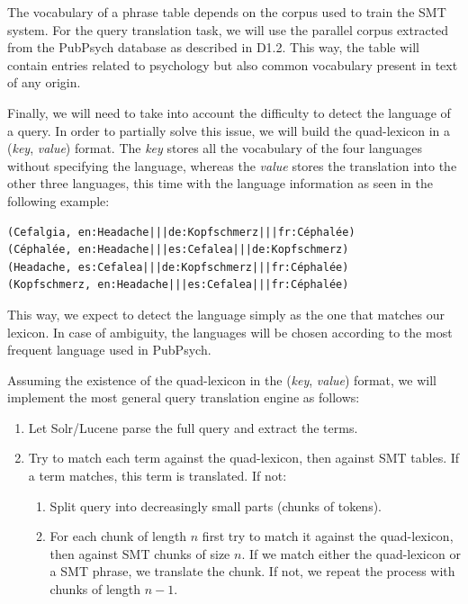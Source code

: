 \documentclass[a4paper,11pt]{article}
\begin{document}
The vocabulary of a phrase table depends on the corpus used to train the SMT system. For the query translation task, we will use the parallel corpus extracted from the PubPsych database as described in D1.2. This way, the table will contain entries related to psychology but also common vocabulary present in text of any origin.

Finally, we will need to take into account the difficulty to detect the language of a query. In order to partially solve this issue, we will build the quad-lexicon in a (\emph{key}, \emph{value}) format. The \emph{key} stores all the vocabulary of the four languages without specifying the language, whereas the \emph{value} stores the translation into the other three languages, this time with the language information as seen in the following example:
{\small
\begin{verbatim}
(Cefalgia, en:Headache|||de:Kopfschmerz|||fr:Céphalée)
(Céphalée, en:Headache|||es:Cefalea|||de:Kopfschmerz)
(Headache, es:Cefalea|||de:Kopfschmerz|||fr:Céphalée)
(Kopfschmerz, en:Headache|||es:Cefalea|||fr:Céphalée)
\end{verbatim}
}

\noindent This way, we expect to detect the language simply as the one that matches our lexicon. In case of ambiguity, the languages will be chosen according to the most frequent language used in PubPsych.

Assuming the existence of the quad-lexicon in the (\emph{key}, \emph{value}) format, we will implement the most general query translation engine as follows:

\begin{enumerate}
 \item Let Solr/Lucene parse the full query and extract the terms.
 \item Try to match each term against the quad-lexicon, then against SMT tables. If a term matches, this term is translated. If not:
 \begin{enumerate}[label*=\arabic*.]
 \item Split query into decreasingly small parts (chunks of tokens).
 \item For each chunk of length $n$ first try to match it against the quad-lexicon, then against SMT chunks of size $n$. If we match either the quad-lexicon or a SMT phrase, we translate the chunk. If not, we repeat the process with chunks of length $n-1$.
 \end{enumerate}
\end{enumerate}
\end{document}
